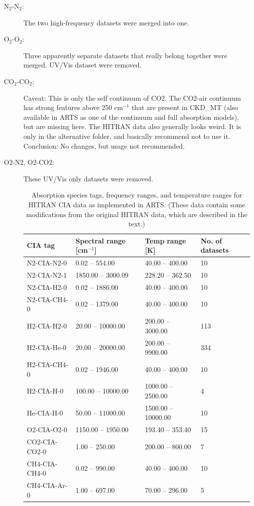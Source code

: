 \begin{description}
\item[N$_2$-N$_2$:] The two high-frequency datasets were merged into one.
\item[O$_2$-O$_2$:] Three apparently separate datasets that really
  belong together were merged. UV/Vis dataset were removed.
\item[CO$_2$-CO$_2$:] Caveat: This is only the self continuum of
  CO2. The CO2-air continuum has strong features above 250 cm$^{-1}$ that
  are present in CKD\_MT (also available in ARTS as one of the
  continuum and full absorption models), but are missing here.  The HITRAN
  data also generally looks weird. It is only in the alternative folder,
  and \citet{richard:12} basically recommend not to use
  it. Conclusion: No changes, but usage not recommended.
\item[O2-N2, O2-CO2:] These UV/Vis only datasets were removed.

\begin{table}
    \caption{Absorption species tags, frequency ranges, and
      temperature ranges for HITRAN CIA data as implemented in
      ARTS. (These data contain some modifications from the original
      HITRAN data, which are described in the text.)} 
    \label{tab:absorption:cia_ranges}
    \centering
    \begin{tabular}{llll}
\hline
    CIA tag& Spectral range [cm$^{-1}$]& Temp range [K]& No. of datasets\\
\hline
  N2-CIA-N2-0& 0.02 -- 554.00& 40.00 -- 400.00& 10\\
  N2-CIA-N2-1& 1850.00 -- 3000.09& 228.20 -- 362.50& 10\\
  N2-CIA-H2-0& 0.02 -- 1886.00& 40.00 -- 400.00& 10\\
  N2-CIA-CH4-0& 0.02 -- 1379.00& 40.00 -- 400.00& 10\\
  H2-CIA-H2-0& 20.00 -- 10000.00& 200.00 -- 3000.00& 113\\
  H2-CIA-He-0& 20.00 -- 20000.00& 200.00 -- 9900.00& 334\\
  H2-CIA-CH4-0& 0.02 -- 1946.00& 40.00 -- 400.00& 10\\
  H2-CIA-H-0& 100.00 -- 10000.00& 1000.00 -- 2500.00& 4\\
  He-CIA-H-0& 50.00 -- 11000.00& 1500.00 -- 10000.00& 10\\
  O2-CIA-O2-0& 1150.00 -- 1950.00& 193.40 -- 353.40& 15\\
  CO2-CIA-CO2-0& 1.00 -- 250.00& 200.00 -- 800.00& 7\\
  CH4-CIA-CH4-0& 0.02 -- 990.00& 40.00 -- 400.00& 10\\
  CH4-CIA-Ar-0& 1.00 -- 697.00& 70.00 -- 296.00& 5\\
\hline
\end{tabular}
\end{table}


\end{description}

